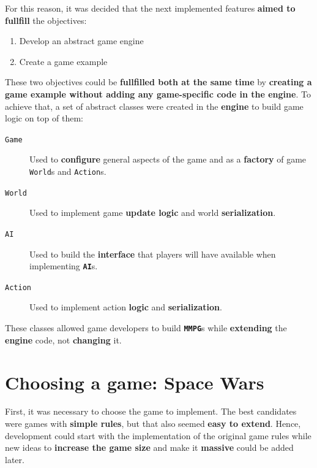 \documentclass[a4paper,11pt,titlepage,abstract,numbers=noenddot,automark,mnsy,intlimits,rgb,dvipsnames]{report}
\begin{document}
For this reason, it was decided that the next implemented features \textbf{aimed to fullfill} the objectives:
\begin{enumerate}
\item
Develop an abstract game engine
\item
Create a game example
\end{enumerate}
These two objectives could be \textbf{fullfilled both at the same time} by \textbf{creating a game example without adding any game-specific
code in the engine}. To achieve that, a set of abstract classes were created in the \textbf{engine} to build game logic on top of them:
\begin{description}
\item[\texttt{Game}]
Used to \textbf{configure} general aspects of the game and as a \textbf{factory} of game \texttt{World}s and \texttt{Action}s.
\item[\texttt{World}]
Used to implement game \textbf{update logic} and world \textbf{serialization}.
\item[\texttt{AI}]
Used to build the \textbf{interface} that players will have available when implementing \textbf{\texttt{AI}}s.
\item[\texttt{Action}]
Used to implement action \textbf{logic} and \textbf{serialization}.
\end{description}
These classes allowed game developers to build \textbf{\texttt{MMPG}}s while \textbf{extending} the \textbf{engine} code, not \textbf{changing} it.
\section{Choosing a game: Space Wars}
First, it was necessary to choose the game to implement. The best candidates were games with \textbf{simple rules}, but that
also seemed \textbf{easy to extend}. Hence, development could start with the implementation of the original game rules while
new ideas to \textbf{increase the game size} and make it \textbf{massive} could be added later.
\end{document}
